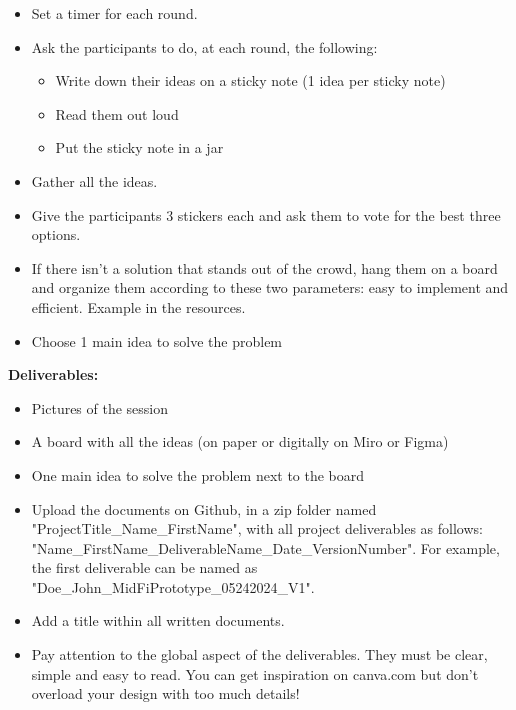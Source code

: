 \begin{itemize}
\begin{itemize}
\begin{itemize}
\begin{itemize}
\item If Pierre was very clumsy
\item If Pierre was very forgetful (and lost memory every 5 minutes)
\item If Pierre was deaf
\item If Pierre was a turtle
\item If Pierre was naked
\item If Pierre couldn't stop talking 24/7
\item If Pierre was always late
\item If Pierre was dishonest
\end{itemize}
\end{itemize}
\item Set a timer for each round.
\item Ask the participants to do, at each round, the following:
\begin{itemize}
\item Write down their ideas on a sticky note (1 idea per sticky note)
\item Read them out loud
\item Put the sticky note in a jar
\end{itemize}
\item Gather all the ideas.
\item Give the participants 3 stickers each and ask them to vote for the best three options.
\item If there isn't a solution that stands out of the crowd, hang them on a board and organize them according to these two parameters: easy to implement and efficient. Example in the resources.
\item Choose 1 main idea to solve the problem
\end{itemize}
\end{itemize}

\textbf{Deliverables:}

\begin{itemize}
\item Pictures of the session
\item A board with all the ideas (on paper or digitally on Miro or Figma)
\item One main idea to solve the problem next to the board
\item Upload the documents on Github, in a zip folder named "ProjectTitle\_Name\_FirstName", with all project deliverables as follows: "Name\_FirstName\_DeliverableName\_Date\_VersionNumber".  For example, the first deliverable can be named as "Doe\_John\_MidFiPrototype\_05242024\_V1".
\item Add a title within all written documents.
\item Pay attention to the global aspect of the deliverables. They must be clear, simple and easy to read. You can get inspiration on canva.com but don't overload your design with too much details!
\end{itemize}

